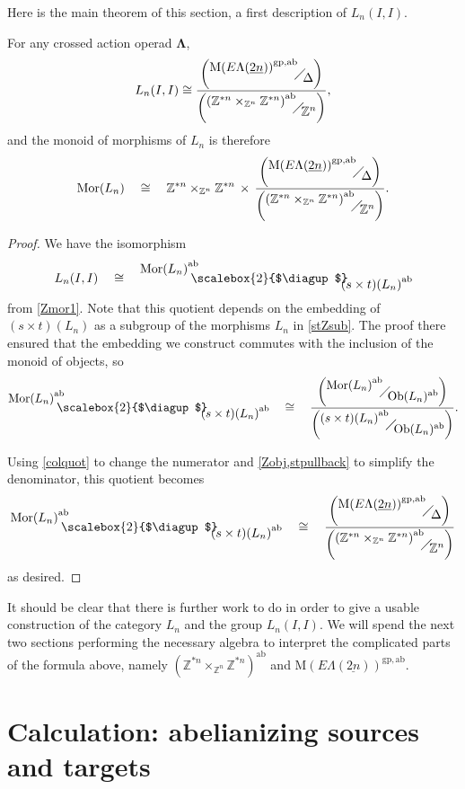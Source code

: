 \documentclass{amsbook} %
\newcommand{\ML}{\mathbf{\Lambda}}
\newcommand{\MorLn}{\mathrm{Mor}(L_n)}
\newcommand{\quotient}[2]{ \raisebox{0.5\height}{$#1$} \mkern-5mu\diagup\mkern-4mu \raisebox{-0.5\height}{$#2$} }
\newcommand{\bigquotient}[2]{ \raisebox{0.75\height}{$#1$} \mkern-12mu\scalebox{2}{$\diagup$}\mkern-10mu \raisebox{-0.5\height}{$#2$} }
\newcommand{\ELnn}{E\Lambda(\underline{2n})}
\numberwithin{section}{chapter}
\begin{document}
Here is the main theorem of this section, a first description of $L_n(I,I)$.

\begin{thm}
For any crossed action operad $\ML$, 
\[
L_n(I,I) \cong \frac{\left(\quotient{{\mathrm{M}(\ELnn)}^{\mathrm{gp},\mathrm{ab}}}{\Delta}\right)}{\left(\quotient{{(\mathbb{Z}^{\ast n} \times_{\mathbb{Z}^n} \mathbb{Z}^{\ast n})}^{\mathrm{ab}}}{\mathbb{Z}^n}\right)}, 
\]
and the monoid of morphisms of $L_n$ is therefore
\[ 
\MorLn \quad \cong \quad \mathbb{Z}^{\ast n} \times_{\mathbb{Z}^n} \mathbb{Z}^{\ast n}  \, \times \, \frac{\left(\quotient{{\mathrm{M}(\ELnn)}^{\mathrm{gp},\mathrm{ab}}}{\Delta}\right)}{\left(\quotient{{(\mathbb{Z}^{\ast n} \times_{\mathbb{Z}^n} \mathbb{Z}^{\ast n})}^{\mathrm{ab}}}{\mathbb{Z}^n}\right)}. \]
\end{thm}
\begin{proof}
We have the isomorphism
\[ L_n(I,I) \quad \cong \quad \bigquotient{{\MorLn}^{\mathrm{ab}}}{{(s \times t)(L_n)}^{\mathrm{ab}}} \]
from \cref{Zmor1}. Note that this quotient  depends on the embedding of $(s \times t)(L_n)$ as a subgroup of the morphisms $L_n$ in \cref{stZsub}. The proof there ensured that the embedding we construct commutes with the inclusion of the monoid of objects, so
\[ \bigquotient{{\MorLn}^{\mathrm{ab}}}{{(s \times t)(L_n)}^{\mathrm{ab}}} \quad \cong \quad \frac{\left(\quotient{{\MorLn}^{\mathrm{ab}}}{\mathrm{Ob}(L_n)^{\mathrm{ab}}}\right)}{\left(\quotient{{(s \times t)(L_n)}^{\mathrm{ab}}}{\mathrm{Ob}(L_n)^{\mathrm{ab}}}\right)}. \]


Using \cref{colquot} to change the numerator and \cref{Zobj,stpullback} to simplify the denominator, this quotient becomes
\[ \bigquotient{{\MorLn}^{\mathrm{ab}}}{{(s \times t)(L_n)}^{\mathrm{ab}}} \quad \cong \quad \frac{\left(\quotient{{\mathrm{M}(\ELnn)}^{\mathrm{gp},\mathrm{ab}}}{\Delta}\right)}{\left(\quotient{{(\mathbb{Z}^{\ast n} \times_{\mathbb{Z}^n} \mathbb{Z}^{\ast n})}^{\mathrm{ab}}}{\mathbb{Z}^n}\right)} \]
as desired.
\end{proof}

It should be clear that there is further work to do in order to give a usable construction of the category $L_n$ and the group $L_n(I,I)$. We will spend the next two sections performing the necessary algebra to interpret the complicated parts of the formula above, namely $(\mathbb{Z}^{\ast n} \times_{\mathbb{Z}^n} \mathbb{Z}^{\ast n})^{\mathrm{ab}}$ and ${\mathrm{M}(\ELnn)}^{\mathrm{gp},\mathrm{ab}}$.

\section{Calculation: abelianizing sources and targets}
 
\end{document}
